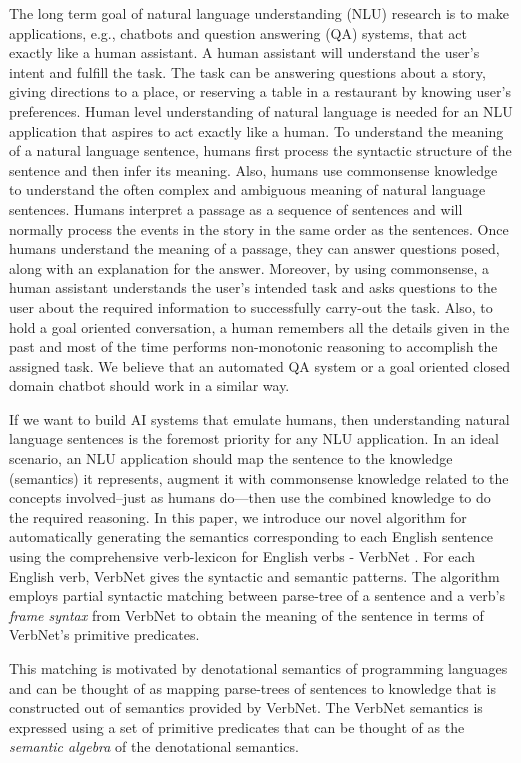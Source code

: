 \documentclass[letterpaper]{article}
\begin{document}
The long term goal of natural language understanding (NLU) research is to make applications, e.g., chatbots and question answering (QA) systems, that act exactly like a human assistant. A human assistant will understand the user's intent and fulfill the task. The task can be answering questions about a story, giving directions to a place, or  reserving a table in a restaurant by knowing user's preferences. Human level understanding of natural language is needed for an NLU application that aspires to act exactly like a human. To understand the meaning of a natural language sentence, humans first process the syntactic structure of the sentence and then infer its meaning. Also, humans use commonsense knowledge to understand the often complex and ambiguous meaning of natural language sentences. Humans interpret a passage as a sequence of sentences and will normally process the events in the story in the same order as the sentences. Once humans understand the meaning of a passage, they can answer questions posed, along with an explanation for the answer. Moreover, by using commonsense, a human assistant understands the user's intended task and asks questions to the user about the required information to successfully carry-out the task. Also, to hold a goal oriented conversation, a human remembers all the details given in the past and most of the time performs non-monotonic reasoning to accomplish the assigned task. We believe that an automated QA system or a goal oriented closed domain chatbot should work in a similar way.

If we want to build AI systems that emulate humans, then understanding natural language sentences is the foremost priority for any NLU application. In an ideal scenario, an NLU application should map the sentence to the knowledge (semantics) it represents, augment it with commonsense knowledge related to the concepts involved--just as humans do---then use the combined knowledge to do the required reasoning. In this paper, we introduce our novel algorithm for automatically generating the semantics corresponding to each English sentence using the comprehensive verb-lexicon for English verbs - VerbNet \cite{vn}. For each English verb, VerbNet gives the syntactic and semantic patterns. The algorithm employs partial syntactic matching between parse-tree of a sentence and a verb's \textit{frame syntax} from VerbNet to obtain the meaning of the sentence in terms of VerbNet's primitive predicates.

This matching is motivated by denotational semantics of programming languages and can be thought of as mapping parse-trees of sentences to knowledge that is constructed out of semantics provided by VerbNet. The VerbNet semantics is expressed using a set of primitive predicates that can be thought of as the \textit{semantic algebra} of the denotational semantics.
\end{document}
